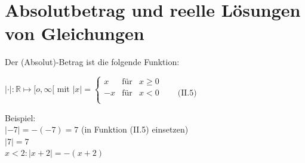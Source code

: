 \section{Absolutbetrag und reelle Lösungen von Gleichungen}

Der (Absolut)-Betrag ist die folgende Funktion:\\
\begin{center}
	$|\cdot|:\mathbb{R}\longmapsto [o,\infty[$\;\;  mit $ |x| =     \left\{ \begin{array}{rcl}
		x & \mbox{für} & x\geq0\\
		-x & \mbox{für} & x< 0 \;\;\;\;\;\;\;\; \text{(II.5) }\\
		
	\end{array}\right.$
\end{center}
\begin{center}
\end{center}
Beispiel:\\
\textbullet\;\;$|-7|=-(-7) =7 $ \tiny{(in Funktion (II.5) einsetzen)}\normalsize \\
\textbullet \;\;$|7|=7$\\
\textbullet \;\;$ x<2:|x+2|=-(x+2) $\\

